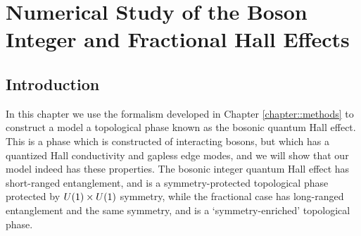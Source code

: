 
\chapter{Numerical Study of the Boson Integer and Fractional Hall Effects}
\label{chapter::FQHE}

\section{Introduction}

In this chapter we use the formalism developed in Chapter \ref{chapter::methods} to construct a model a topological phase known as the bosonic quantum Hall effect. This is a phase which is constructed of interacting bosons, but which has a quantized Hall conductivity and gapless edge modes, and we will show that our model indeed has these properties. The bosonic integer quantum Hall effect has short-ranged entanglement, and is a symmetry-protected topological phase protected by $U(1)\times U(1)$ symmetry, while the fractional case has long-ranged entanglement and the same symmetry, and is a `symmetry-enriched' topological phase\cite{EssenHermele}. 

